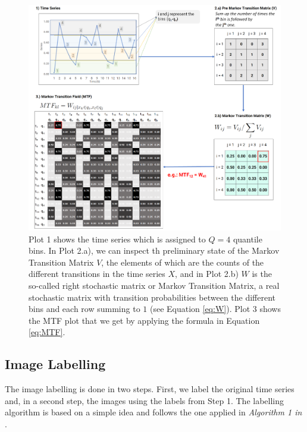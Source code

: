 \documentclass[11pt, a4paper]{article}
\begin{document}
\begin{figure}[ht!]
    \centering
    \includegraphics[width=\textwidth]{images/MTF.png}
    \caption{Plot 1 shows the time series which is assigned to $Q=4$ quantile bins. In Plot 2.a), we can inspect th preliminary state of the Markov Transition Matrix $V$, the elements of which are the counts of the different transitions in the time series $X$, and in Plot 2.b) $W$ is the so-called right stochastic matrix or Markov Transition Matrix, a real stochastic matrix with transition probabilities between the different bins and each row summing to $1$ (see Equation \ref{eq:W}). Plot 3 shows the MTF plot that we get by applying the formula in Equation \ref{eq:MTF}.}
    \label{fig:MTF}
\end{figure}

\subsection{Image Labelling}
\label{subsec:DM:IL}
The image labelling is done in two steps. First, we label the original time series and, in a second step, the images using the labels from Step 1.
The labelling algorithm is based on a simple idea and follows the one applied in \textit{Algorithm 1 in} \cite{sezer2018algorithmic}.
\end{document}
